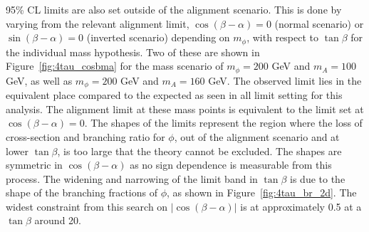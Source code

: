95\% \ac{CL} limits are also set outside of the alignment scenario.
This is done by varying from the relevant alignment limit, $\cos(\beta-\alpha)=0$ (normal scenario) or $\sin(\beta-\alpha)=0$ (inverted scenario) depending on $m_\phi$, with respect to $\tan\beta$ for the individual mass hypothesis.
Two of these are shown in Figure~\ref{fig:4tau_cosbma} for the mass scenario of $m_{\phi} = 200$ GeV and $m_{A} = 100$ GeV, as well as $m_{\phi} = 200$ GeV and $m_{A} = 160$ GeV.
The observed limit lies in the equivalent place compared to the expected as seen in all limit setting for this analysis.
The alignment limit at these mass points is equivalent to the limit set at $\cos(\beta-\alpha) = 0$.
The shapes of the limits represent the region where the loss of cross-section and branching ratio for $\phi$, out of the alignment scenario and at lower $\tan\beta$, is too large that the theory cannot be excluded.
The shapes are symmetric in $\cos(\beta-\alpha)$ as no sign dependence is measurable from this process.
The widening and narrowing of the limit band in $\tan\beta$ is due to the shape of the branching fractions of $\phi$, as shown in Figure~\ref{fig:4tau_br_2d}.
The widest constraint from this search on $|\cos(\beta-\alpha)|$ is at approximately 0.5 at a $\tan\beta$ around 20.

